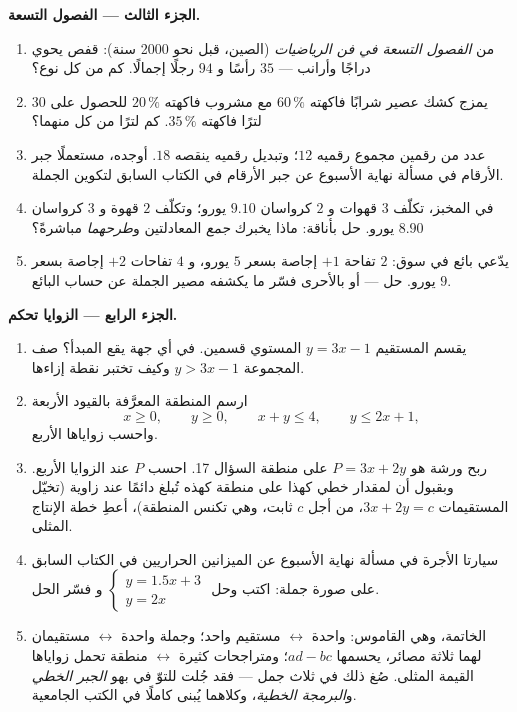 \begin{problem}
\medskip
\noindent\textbf{الجزء الثالث --- الفصول التسعة.}
\begin{enumerate}[resume]
  \item من \emph{الفصول التسعة في فن الرياضيات}
        (الصين، قبل نحو 2000 سنة): قفص يحوي دراجًا
        وأرانب --- $35$ رأسًا و $94$ رجلًا إجمالًا. كم
        من كل نوع؟
  \item يمزج كشك عصير شرابًا فاكهته $60\,\%$ مع
        مشروب فاكهته $20\,\%$ للحصول على $30$ لترًا فاكهته
        $35\,\%$. كم لترًا من كل منهما؟
  \item عدد من رقمين مجموع رقميه $12$؛ وتبديل
        رقميه ينقصه $18$. أوجده، مستعملًا جبر الأرقام
        في مسألة نهاية الأسبوع عن جبر الأرقام في الكتاب السابق لتكوين الجملة.
  \item في المخبز، تكلّف $3$ قهوات و $2$ كرواسان
        $9.10$ يورو؛ وتكلّف $2$ قهوة و $3$ كرواسان
        $8.90$ يورو. حل بأناقة: ماذا يخبرك \emph{جمع}
        المعادلتين و\emph{طرحهما} مباشرةً؟
  \item يدّعي بائع في سوق: $2$ تفاحة $+ 1$ إجاصة بسعر
        $5$ يورو، و $4$ تفاحات $+ 2$ إجاصة بسعر $9$ يورو.
        حل --- أو بالأحرى فسّر ما يكشفه مصير الجملة
        عن حساب البائع.
\end{enumerate}

\medskip
\noindent\textbf{الجزء الرابع --- الزوايا تحكم.}
\begin{enumerate}[resume]
  \item يقسم المستقيم $y = 3x - 1$ المستوي قسمين. في أي
        جهة يقع المبدأ؟ صف المجموعة
        $y > 3x - 1$ وكيف تختبر نقطة إزاءها.
  \item ارسم المنطقة المعرَّفة بالقيود الأربعة
        \[
        x \geq 0, \qquad y \geq 0, \qquad x + y \leq 4,
        \qquad y \leq 2x + 1,
        \]
        واحسب زواياها الأربع.
  \item ربح ورشة هو $P = 3x + 2y$ على منطقة
        السؤال 17. احسب $P$ عند الزوايا الأربع. وبقبول
        أن  لمقدار خطي كهذا على منطقة كهذه
        تُبلغ دائمًا عند زاوية (تخيّل المستقيمات $3x + 2y = c$، من أجل $c$ ثابت، وهي تكنس المنطقة)، أعطِ خطة
        الإنتاج المثلى.
  \item سيارتا الأجرة في مسألة نهاية الأسبوع عن الميزانين الحراريين في الكتاب السابق على صورة جملة:
        اكتب وحل
        $\begin{cases} y = 1.5x + 3 \\ y = 2x \end{cases}$ و
        فسّر الحل.
  \item الخاتمة، وهي القاموس:  واحدة $\leftrightarrow$
        مستقيم واحد؛ وجملة واحدة $\leftrightarrow$ مستقيمان لهما
        ثلاثة مصائر، يحسمها $ad - bc$؛ ومتراجحات كثيرة
        $\leftrightarrow$ منطقة تحمل زواياها
        القيمة المثلى. صُغ ذلك في ثلاث جمل --- فقد جُلت للتوّ
        في بهو \emph{الجبر الخطي} و\emph{البرمجة
        الخطية}، وكلاهما يُبنى كاملًا في الكتب الجامعية.
\end{enumerate}
\end{problem}
